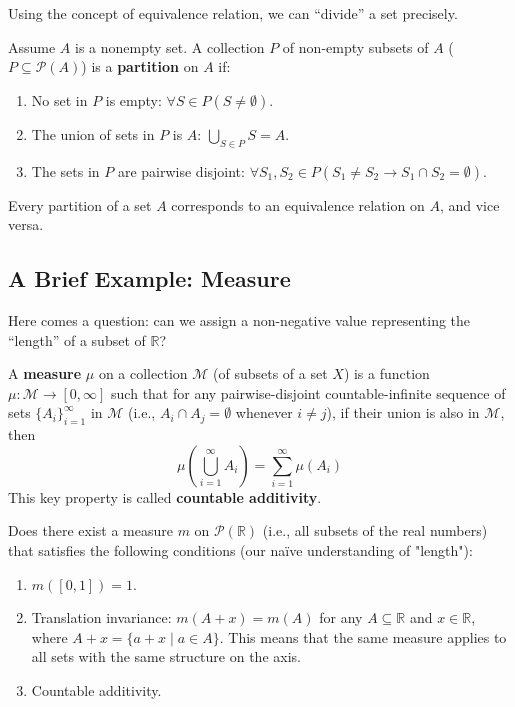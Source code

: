 Using the concept of equivalence relation, we can “divide” a set precisely.
\begin{definition}[Partition]
Assume $A$ is a nonempty set. A collection $P$ of non-empty subsets of $A$ ($P \subseteq \mathcal{P}(A)$) is a \textbf{partition} on $A$ if:
\begin{enumerate}
    \item No set in $P$ is empty: $\forall S \in P (S \ne \emptyset)$.
    \item The union of sets in $P$ is $A$: $\bigcup_{S \in P} S = A$.
    \item The sets in $P$ are pairwise disjoint: $\forall S_1, S_2 \in P (S_1 \ne S_2 \to S_1 \cap S_2 = \emptyset)$.
\end{enumerate}
\end{definition}

\begin{theorem}
Every partition of a set $A$ corresponds to an equivalence relation on $A$, and vice versa.
\end{theorem}

\subsection{A Brief Example: Measure}
Here comes a question: can we assign a non-negative value representing the “length” of a subset of $\mathbb{R}$?

\begin{definition}[Measure]
A \textbf{measure} $\mu$ on a collection $\mathcal{M}$ (of subsets of a set $X$) is a function $\mu: \mathcal{M} \to [0, \infty]$ such that for any pairwise-disjoint countable-infinite sequence of sets $\{A_i\}_{i=1}^\infty$ in $\mathcal{M}$ (i.e., $A_i \cap A_j = \emptyset$ whenever $i \ne j$), if their union is also in $\mathcal{M}$, then
$$ \mu\left(\bigcup_{i=1}^\infty A_i\right) = \sum_{i=1}^\infty \mu(A_i) $$
This key property is called \textbf{countable additivity}.
\end{definition}

Does there exist a measure $m$ on $\mathcal{P}(\mathbb{R})$ (i.e., all subsets of the real numbers) that satisfies the following conditions (our naïve understanding of "length"):
\begin{enumerate}
    \item $m([0,1]) = 1$.
    \item Translation invariance: $m(A+x) = m(A)$ for any $A \subseteq \mathbb{R}$ and $x \in \mathbb{R}$, where $A+x = \{a+x \mid a \in A\}$. This means that the same measure applies to all sets with the same structure on the axis.
    \item Countable additivity.
\end{enumerate}

